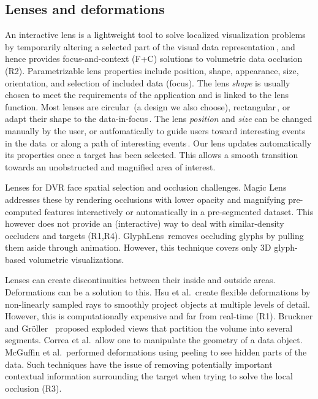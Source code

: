 \subsection{Lenses and deformations}
%
An interactive lens is a lightweight tool to solve localized visualization problems by temporarily altering a selected part of the visual data representation\,\cite{CGF:CGF12871}, and hence provides focus-and-context (F+C) solutions to volumetric data occlusion (R2). Parametrizable lens properties include position, shape, appearance, size, orientation, and selection of included data (focus). The lens \emph{shape} is usually chosen to meet the requirements of the application and is linked to the lens function. Most lenses are circular\,\cite{1648236} (a design we also choose), rectangular\,\cite{Kincaid:2010:SFA:1907651.1907963}, or adapt their shape to the data-in-focus\,\cite{Pindat:2012:JCA:2380116.2380150,Thiede2008}. The lens \emph{position} and \emph{size} can be changed manually by the user, or autfomatically to guide users toward interesting events in the data\,\cite{Tominski:2011:ECU:2336207.2336211} or along a path of interesting events\,\cite{Alvina:2014:RER:2598153.2598200}. Our lens updates automatically its properties once a target has been selected. This allows a smooth transition towards an unobstructed and magnified area of interest.

Lenses for DVR face spatial selection and occlusion challenges. Magic Lens\,\cite{1532818} addresses these by rendering occlusions with lower opacity and magnifying pre-computed features interactively or automatically in a pre-segmented dataset. This however does not provide an (interactive) way to deal with similar-density occluders and targets (R1,R4). GlyphLens\,\cite{7539643} removes occluding glyphs by pulling them aside through animation. However, this technique covers only 3D glyph-based volumetric visualizations. 

Lenses can create discontinuities between their inside and outside areas. Deformations can be a solution to this.
Hsu et al.\,\cite{Hsu:2011:RFM:2070781.2024165} create flexible deformations by non-linearly sampled rays to smoothly project objects at multiple levels of detail. However, this is computationally expensive and far from real-time (R1). Bruckner and Gr{\"o}ller~\cite{4015467} proposed exploded views that partition the volume into several segments. Correa et al.\,\cite{Correa:2007:IDD:1313046.1313163,Correa:2006:FAV:1187627.1187827} allow one to manipulate the geometry of a data object. McGuffin et al.\,\cite{1250400} performed deformations using peeling to see hidden parts of the data. Such techniques have the issue of removing potentially important contextual information surrounding the target when trying to solve the local occlusion (R3).

